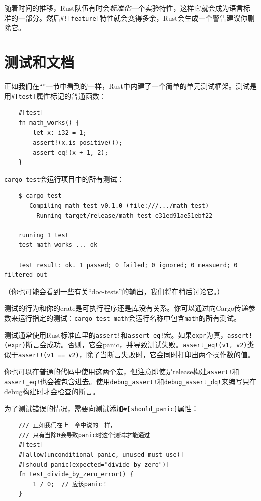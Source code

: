随着时间的推移，Rust队伍有时会\emph{标准化}一个实验特性，这样它就会成为语言标准的一部分。然后\texttt{\#![feature]}特性就会变得多余，Rust会生成一个警告建议你删除它。

\section{测试和文档}

正如我们在“”一节中看到的一样，Rust中内建了一个简单的单元测试框架。测试是用\texttt{\#[test]}属性标记的普通函数：
\begin{verbatim}
    #[test]
    fn math_works() {
        let x: i32 = 1;
        assert!(x.is_positive());
        assert_eq!(x + 1, 2);
    }
\end{verbatim}

\texttt{cargo test}会运行项目中的所有测试：
\begin{verbatim}
    $ cargo test
       Compiling math_test v0.1.0 (file:///.../math_test)
         Running target/release/math_test-e31ed91ae51ebf22
    
    running 1 test
    test math_works ... ok

    test result: ok. 1 passed; 0 failed; 0 ignored; 0 measuerd; 0 filtered out
\end{verbatim}
（你也可能会看到一些有关“doc-tests”的输出，我们将在稍后讨论它。）

测试的行为和你的crate是可执行程序还是库没有关系。你可以通过向Cargo传递参数来运行指定的测试：\texttt{cargo test math}会运行名称中包含\texttt{math}的所有测试。

测试通常使用Rust标准库里的\texttt{assert!}和\texttt{assert\_eq!}宏。如果\texttt{expr}为真，\texttt{assert!(expr)}断言会成功。否则，它会panic，并导致测试失败。\texttt{assert\_eq!(v1, v2)}类似于\texttt{assert!(v1 == v2)}，除了当断言失败时，它会同时打印出两个操作数的值。

你也可以在普通的代码中使用这两个宏，但注意即使是release构建\texttt{assert!}和\texttt{assert\_eq!}也会被包含进去。使用\texttt{debug\_assert!}和\texttt{debug\_assert\_dq!}来编写只在debug构建时才会检查的断言。

为了测试错误的情况，需要向测试添加\texttt{\#[should\_panic]}属性：
\begin{verbatim}
    /// 正如我们在上一章中说的一样，
    /// 只有当除0会导致panic时这个测试才能通过
    #[test]
    #[allow(unconditional_panic, unused_must_use)]
    #[should_panic(expected="divide by zero")]
    fn test_divide_by_zero_error() {
        1 / 0;  // 应该panic！
    }
\end{verbatim}

